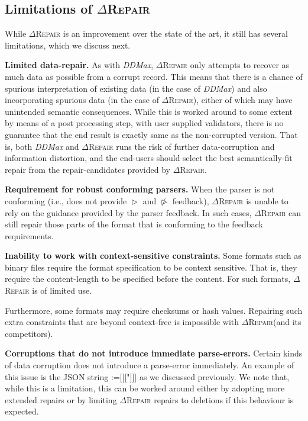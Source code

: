 \documentclass[acmsmall,screen,review,anonymous]{acmart}
\makeatletter
\newcommand{\revise}[1]{\textcolor{black}{#1}}
\def\Rincomplete{\texttt{\color{incompletecolor}\textbf{$\vartriangleright$}}\xspace}
\def\Rincorrect{\texttt{\color{incorrectcolor}\textbf{$\ntriangleright$}}\xspace}
\newcommand{\approach}{\textsc{$\Delta$Repair}\xspace}
\newcommand{\ddmax}{\textit{DDMax}\xspace}
\newcommand{\drepair}{\approach}
\newcommand\letterboxed[1]{%
\setlength{\fboxsep}{0pt}%
  \@tfor\@ii:=#1\do{%
    \fcolorbox{light-gray}{white}%
    {\texttt{\strut\@ii}}%
  }%
}
\makeatother
\begin{document}
\subsection{Limitations of \drepair}
While \drepair is an improvement over the state of the art, it still has
several limitations, which we discuss next.


\noindent\textbf{Limited data-repair.} As with \ddmax, \drepair only attempts
to recover as much data as possible from a corrupt record. This means that there
is a chance of spurious interpretation of existing data (in the case of \ddmax)
and also incorporating spurious data (in the case of \drepair), either of which
may have unintended semantic consequences. While this is
worked around to some extent by means of a post processing step, with user
supplied validators, there is no guarantee that the end result is exactly same
as the non-corrupted version. That is, both \ddmax and \drepair runs the risk
of further data-corruption and information distortion, and the end-users should
select the best semantically-fit repair from the repair-candidates provided by
\drepair.

\noindent\textbf{Requirement for robust conforming parsers.}
When the parser is not conforming (i.e., does not provide \Rincomplete and \Rincorrect feedback), \drepair is unable to rely on the
guidance provided by the parser feedback. In such cases, \drepair can
still repair those parts of the format that is conforming to the feedback
requirements.

\noindent\textbf{Inability to work with context-sensitive constraints.} 
Some formats such as binary files require the format specification to be
context sensitive. That is, they require the content-length to be specified
before the content. For such formats, \drepair is of limited use.

Furthermore,  some formats may require checksums or hash values. Repairing
such extra constraints that are beyond context-free is impossible with
\drepair (and its competitors).


\noindent\textbf{Corruptions that do not introduce immediate parse-errors.}
Certain kinds of data corruption does not introduce a parse-error immediately.
An example of this issue is the JSON string \letterboxed{[[["]]]} as we discussed
previously.
We note that, while this is a limitation, this can be worked around either
by adopting more extended repairs or by limiting \drepair repairs to deletions
if this behaviour is expected.
\end{document}

